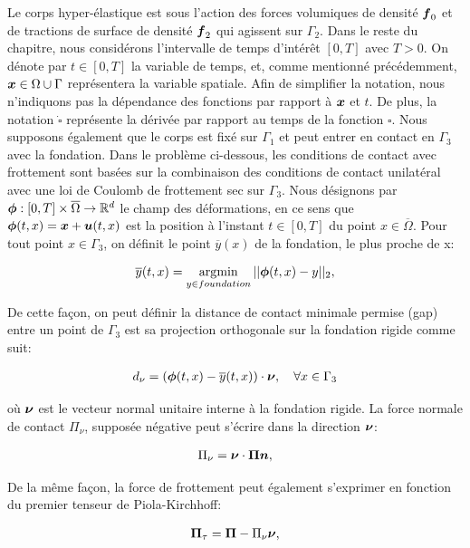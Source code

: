 Le corps hyper-élastique est sous l'action des forces volumiques de densité $\mbox{\boldmath{$f$}}_0$ et de tractions de surface de densité $\mbox{\boldmath{$f$}}_2$
qui agissent sur $\Gamma_2$. Dans le reste du chapitre, nous considérons l'intervalle de temps d'intérêt $[0,T]$ avec $T>0$. On dénote par $t\in [0,T]$ la variable de temps, et, comme mentionné précédemment, $\mbox{\boldmath{$x$}}\in \Omega\cup\Gamma$ représentera la variable spatiale. Afin de simplifier la notation, nous n'indiquons pas la dépendance des fonctions par rapport à $\mbox{\boldmath{$x$}}$ et $t$. De plus, la notation $\dot\square$ représente la dérivée par rapport au temps de la fonction $\square$. Nous supposons également que le corps est fixé sur $\Gamma_1$ et peut entrer en contact en $\Gamma_3$ avec la fondation. Dans le problème ci-dessous, les conditions de contact avec frottement sont basées sur la combinaison des conditions de contact unilatéral avec une loi de Coulomb de frottement sec sur $\Gamma_3$. Nous désignons par $\mbox{\boldmath{$\phi$}}:[0,T]\times\overline{\Omega}\to\mathbb{R}^d$ le champ des déformations, en ce sens que $\mbox{\boldmath{$\phi$}}(t,x)=\mbox{\boldmath{$x$}}+\mbox{\boldmath{$u$}}(t,x)$ est la position à l'instant $t\in[0,T]$ du point $x\in\overline{\Omega}$. Pour tout point $x\in\Gamma_3$, on définit le point $\overline{y}(x)$ de la fondation, le plus proche de x:

\begin{eqnarray*}
\overline{y}(t,x)=\operatorname*{\arg\!\min}_{y\in foundation}||\mbox{\boldmath{$\phi$}} (t,x)-y||_2,
\end{eqnarray*}

De cette façon, on peut définir la distance de contact minimale permise (gap) entre un point de $\Gamma_3$ est sa projection orthogonale sur la fondation rigide comme suit:

\begin{eqnarray*}
d_{\nu}=(\mbox{\boldmath{$\phi$}}(t,x)-\overline{y}(t,x))\cdot\mbox{\boldmath{$\nu$}}, \quad \forall x \in \Gamma_3
\end{eqnarray*}

\noindent où $\mbox{\boldmath{$\nu$}}$ est le vecteur normal unitaire interne à la fondation rigide. La force normale de contact $\Pi_\nu$, supposée négative peut s'écrire dans la direction $\mbox{\boldmath{$\nu$}}$:

\begin{eqnarray*}
\Pi_\nu=\mbox{\boldmath{$\nu$}} \cdot \mbox{\boldmath{$\Pi$}} \mbox{\boldmath{$n$}},
\end{eqnarray*}

De la même façon, la force de frottement peut également s'exprimer en fonction du premier tenseur de Piola-Kirchhoff:

\begin{eqnarray*}
\mbox{\boldmath{$\Pi$}}_{\tau}=\mbox{\boldmath{$\Pi$}}-\Pi_{\nu} \mbox{\boldmath{$\nu$}},
\end{eqnarray*}

